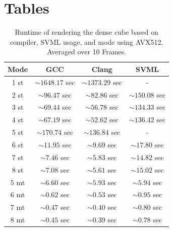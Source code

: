 \documentclass[a4paper, 11pt]{memoir}
\begin{document}
    \appendix
    \chapter{Tables}
    \label{ch:tables}
    \begin{table}[H]
        \centering
        \begin{tabular}{|c | c | c | c|}
            \hline
            Mode & GCC               & Clang & SVML\\\hline
            1 st & $\sim1648.17$ sec & $\sim1373.29$ sec & - \\
            2 st & $\sim96.47$ sec   & $\sim82.86$ sec   & $\sim150.08$ sec\\
            3 st & $\sim69.44$ sec   & $\sim56.78$ sec   & $\sim134.33$ sec\\
            4 st & $\sim67.19$ sec   & $\sim52.62$ sec   & $\sim136.42$ sec\\
            5 st & $\sim170.74$ sec  & $\sim136.84$ sec  & - \\
            6 st & $\sim11.95$ sec   & $\sim9.69$ sec    & $\sim17.80$ sec\\
            7 st & $\sim7.46$ sec    & $\sim5.83$ sec    & $\sim14.82$ sec\\
            8 st & $\sim7.08$ sec    & $\sim5.61$ sec    & $\sim15.02$ sec\\\hline\hline

            5 mt & $\sim6.60$ sec    & $\sim5.93$ sec    & $\sim5.94$ sec\\
            6 mt & $\sim0.62$ sec    & $\sim0.53$ sec    & $\sim0.95$ sec\\
            7 mt & $\sim0.47$ sec    & $\sim0.40$ sec    & $\sim0.80$ sec\\
            8 mt & $\sim0.45$ sec    & $\sim0.39$ sec    & $\sim0.78$ sec\\
            \hline
        \end{tabular}
        \caption{Runtime of rendering the dense cube based on compiler, SVML usage, and mode using AVX512. Averaged over 10 Frames.}
        \label{tab:perf_dense_cube_avx512}
    \end{table}
\end{document}

